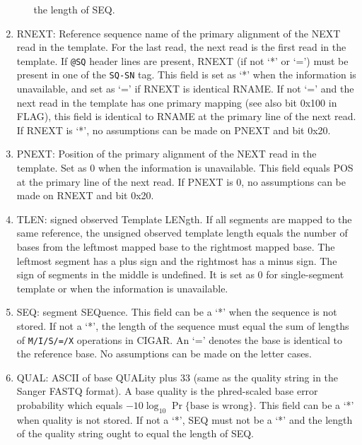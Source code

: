 \documentclass[10pt]{article}
\begin{document}
\begin{enumerate}
\begin{itemize}
    the length of {\sf SEQ}.
  \end{itemize}
\item {\sf RNEXT}: Reference sequence name of the primary alignment of the NEXT read in the
  template. For the last read, the next read is the first
  read in the template. If {\tt @SQ} header lines are present, {\sf
    RNEXT} (if not `*' or `=') must be present in one of the {\tt SQ-SN}
  tag. This field is set as `*' when the information is unavailable, and
  set as `=' if {\sf RNEXT} is identical {\sf RNAME}. If not `=' and the
  next read in the template has one primary mapping (see also bit
  0x100 in {\sf FLAG}), this field is identical to {\sf RNAME} at the primary line of the
  next read.  If {\sf
    RNEXT} is `*', no assumptions can be made on {\sf PNEXT} and bit
  0x20.
\item {\sf PNEXT}: Position of the primary alignment of the NEXT read in the template. Set as
  0 when the information is unavailable. This field equals {\sf POS} at the primary line of
  the next read. If {\sf PNEXT} is 0, no assumptions can be made on
  {\sf RNEXT} and bit 0x20.
\item {\sf TLEN}: signed observed Template LENgth. If all segments are
  mapped to the same reference, the unsigned observed template length
  equals the number of bases from the leftmost mapped base to the
  rightmost mapped base. The leftmost segment has a plus sign and the
  rightmost has a minus sign. The sign of segments in the middle is
  undefined. It is set as 0 for single-segment template or when the
  information is unavailable.
\item {\sf SEQ}: segment SEQuence. This field can be a `*' when the
  sequence is not stored. If not a `*', the length of the sequence must
  equal the sum of lengths of {\tt M/I/S/=/X} operations in {\sf CIGAR}.
  An `=' denotes the base is identical to the reference base. No
  assumptions can be made on the letter cases.
\item {\sf QUAL}: ASCII of base QUALity plus 33 (same as the quality
  string in the Sanger FASTQ format). A base quality is the phred-scaled
  base error probability which equals $-10\log_{10}\Pr\{\mbox{base is
    wrong}\}$. This field can be a `*' when quality is not stored. If
  not a `*', {\sf SEQ} must not be a `*' and the length of the quality string
  ought to equal the length of {\sf SEQ}.
\end{enumerate}
\end{document}
